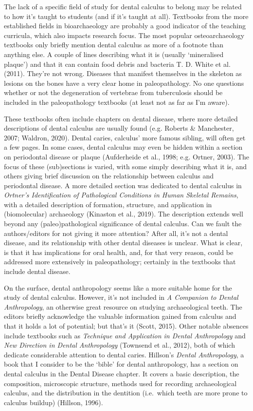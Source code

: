 \documentclass[
  letterpaper,
]{book}
\begin{document}
The lack of a specific field of study for dental calculus to belong may
be related to how it's taught to students (and if it's taught at all).
Textbooks from the more established fields in bioarchaeology are
probably a good indicator of the teaching curricula, which also impacts
research focus. The most popular osteoarchaeology textbooks only briefly
mention dental calculus as more of a footnote than anything else. A
couple of lines describing what it is (usually `mineralised plaque') and
that it can contain food debris and bacteria T. D. White et al. (2011).
They're not wrong. Diseases that manifest themselves in the skeleton as
lesions on the bones have a very clear home in paleopathology. No one
questions whether or not the degeneration of vertebrae from tuberculosis
should be included in the paleopathology textbooks (at least not as far
as I'm aware).

These textbooks often include chapters on dental disease, where more
detailed descriptions of dental calculus are usually found (e.g. Roberts
\& Manchester, 2007; Waldron, 2020). Dental caries, calculus' more
famous sibling, will often get a few pages. In some cases, dental
calculus may even be hidden within a section on periodontal disease or
plaque (Aufderheide et al., 1998; e.g. Ortner, 2003). The focus of these
(sub)sections is varied, with some simply describing what it is, and
others giving brief discussion on the relationship between calculus and
periodontal disease. A more detailed section was dedicated to dental
calculus in \emph{Ortner's Identification of Pathological Conditions in
Human Skeletal Remains}, with a detailed description of formation,
structure, and application in (biomolecular) archaeology (Kinaston et
al., 2019). The description extends well beyond any (paleo)pathological
significance of dental calculus. Can we fault the authors/editors for
not giving it more attention? After all, it's not a dental disease, and
its relationship with other dental diseases is unclear. What is clear,
is that it has implications for oral health, and, for that very reason,
could be addressed more extensively in paleopathology; certainly in the
textbooks that include dental disease.

On the surface, dental anthropology seems like a more suitable home for
the study of dental calculus. However, it's not included in \emph{A
Companion to Dental Anthropology}, an otherwise great resource on
studying archaeological teeth. The editors briefly acknowledge the
valuable information gained from calculus and that it holds a lot of
potential; but that's it (Scott, 2015). Other notable absences include
textbooks such as \emph{Technique and Application in Dental
Anthropology} and \emph{New Direction in Dental Anthropology} (Townsend
et al., 2012), both of which dedicate considerable attention to dental
caries. Hillson's \emph{Dental Anthropology}, a book that I consider to
be the `bible' for dental anthropology, has a section on dental calculus
in the Dental Disease chapter. It covers a basic description, the
composition, microscopic structure, methods used for recording
archaeological calculus, and the distribution in the dentition
(i.e.~which teeth are more prone to calculus buildup) (Hillson, 1996).
\end{document}
